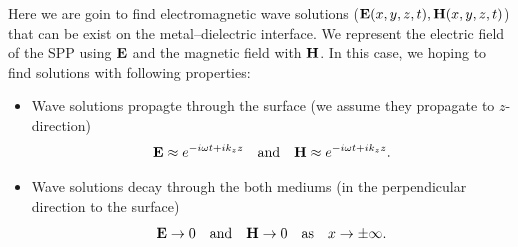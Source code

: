 \documentclass[a4paper]{article}
\numberwithin{equation}{subsection}
\numberwithin{equation}{section}
\begin{document}
Here we are goin to find electromagnetic wave solutions ($\vb{E}(x,y,z,t),\vb{H}(x,y,z,t)$) that can be exist on the metal–dielectric interface. We represent the electric field of the SPP using $\vb{E}$ and the magnetic field with $\vb{H}$. In this case, we hoping to find solutions with following properties:
\begin{itemize}
  \item Wave solutions propagte through the surface (we assume they propagate to $z$-direction) \\
  \begin{equation} \nonumber
    \vb{E} \approx e^{-i\omega t + ik_z z} \quad
    \text{and} \quad
    \vb{H} \approx e^{-i\omega t + ik_z z}.
  \end{equation}
  \item Wave solutions decay through the both mediums (in the perpendicular direction to the surface) \\
  \begin{equation} \nonumber
    \vb{E} \rightarrow 0 \quad
    \text{and} \quad
    \vb{H} \rightarrow 0 \quad
    \text{as} \quad
    x \rightarrow \pm \infty.
  \end{equation}
\end{itemize}
\end{document}
